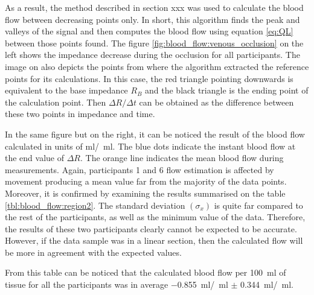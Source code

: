 As a result, the method described in section xxx was used to calculate the blood flow between decreasing points only. In short, this algorithm finds the peak and valleys of the signal and then computes the blood flow using equation \ref{eq:QL} between those points found. The figure \ref{fig:blood_flow:venous_occlusion} on the left shows the impedance decrease during the occlusion for all participants. The image on also depicts the points from where the algorithm extracted the reference points for its calculations. In this case, the red triangle pointing downwards is equivalent to the base impedance $R_B$ and the black triangle is the ending point of the calculation point. Then $\Delta R / \Delta t$ can be obtained as the difference between these two points in impedance and time. 

In the same figure but on the right, it can be noticed the result of the blood flow calculated in units of \si{\ml /  \ml}. The blue dots indicate the instant blood flow at the end value of $\Delta R$. The orange line indicates the mean blood flow during measurements. Again, participants 1 and 6 flow estimation is affected by movement producing a mean value far from the majority of the data points. Moreover, it is confirmed by examining the results summarised on the table \ref{tbl:blood_flow:region2}. The standard deviation $(\sigma_x)$ is quite far compared to the rest of the participants, as well as the minimum value of the data. Therefore, the results of these two participants clearly cannot be expected to be accurate. However, if the data sample was in a linear section, then the calculated flow will be more in agreement with the expected values. 

From this table can be noticed that the calculated blood flow per \SI{100}{\ml} of tissue for all the participants was in average \SI{-0.855}{\ml / \ml} $\pm$ \SI{0.344}{\ml/\ml}. 

